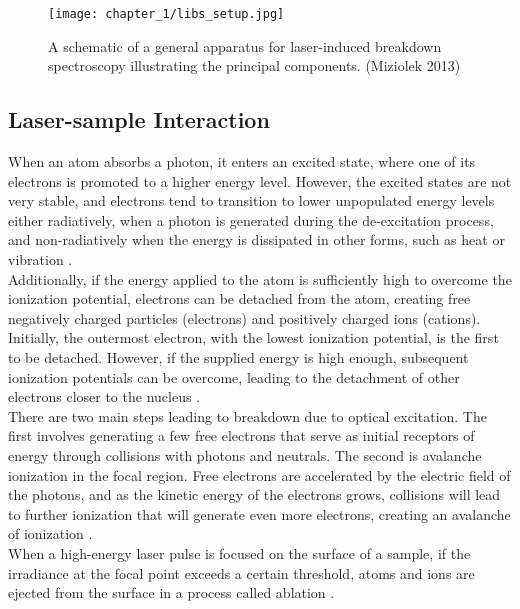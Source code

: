 \begin{figure}[H]
    \centering
    \texttt{[image: chapter\_1/libs\_setup.jpg]}
    \caption{A schematic of a general apparatus for laser-induced breakdown spectroscopy illustrating the principal components. (Miziolek 2013)}
    \label{fig:libs_setup}
\end{figure}

\subsection{Laser-sample Interaction}
\label{subsec:laser-sample_int}

When an atom absorbs a photon, it enters an excited state, where one of its electrons is promoted to a higher energy level. However, the excited states are not very stable, and electrons tend to transition to lower unpopulated energy levels either radiatively, when a photon is generated during the de-excitation process, and non-radiatively when the energy is dissipated in other forms, such as heat or vibration \cite{singhPreface2007}.
\\
Additionally, if the energy applied to the atom is sufficiently high to overcome the ionization potential, electrons can be detached from the atom, creating free negatively charged particles (electrons) and positively charged ions (cations). Initially, the outermost electron, with the lowest ionization potential, is the first to be detached. However, if the supplied energy is high enough, subsequent ionization potentials can be overcome, leading to the detachment of other electrons closer to the nucleus \cite{cagnacModernAtomicPhysics1975}.
\\
There are two main steps leading to breakdown due to optical excitation. The first involves generating a few free electrons that serve as initial receptors of energy through collisions with photons and neutrals. The second is avalanche ionization in the focal region. Free electrons are accelerated by the electric field of the photons, and as the kinetic energy of the electrons grows, collisions will lead to further ionization that will generate even more electrons, creating an avalanche of ionization \cite{cabalinExperimentalDeterminationLaser1998}. 
\\
When a high-energy laser pulse is focused on the surface of a sample, if the irradiance at the focal point exceeds a certain threshold, atoms and ions are ejected from the surface in a process called ablation \cite{fortesLaserinducedBreakdownSpectroscopy2013}.

